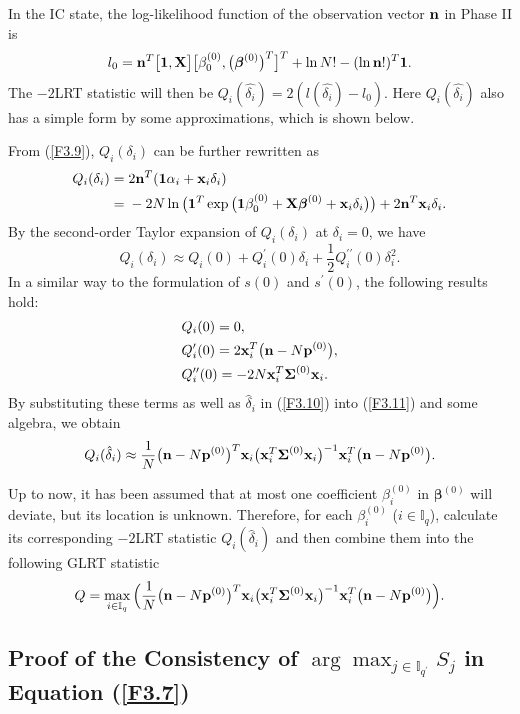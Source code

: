 In the IC state, the log-likelihood function of the observation vector ${\bf n}$ in
Phase II is
\[
l_0={\bf n}^T\big[\boldsymbol{1},{\bf
X}\big]\big[\beta^{(0)}_0,\big(\boldsymbol{\beta}^{(0)}\big)^T\big]^T+\ln N!-(\ln{\bf
n}!)^T\boldsymbol{1}.
\]
The $-2$LRT statistic will then be $Q_i(\hat{\delta_i})=2(l(\hat{\delta_i})-l_0)$.
Here $Q_i(\hat{\delta_i})$ also has a simple form by some approximations, which is
shown below.

From (\ref{F3.9}), $Q_i(\delta_i)$ can be further rewritten as
\begin{align*}
Q_i(\delta_i)=&\;2{\bf n}^T(\boldsymbol{1}\alpha_i+{\bf
x}_i\delta_i)\\
=&\;-2N\ln\big(\boldsymbol{1}^T\exp\big(\boldsymbol{1}\beta^{(0)}_0 +{\bf X}\boldsymbol\beta^{(0)}+{\bf
x}_i\delta_i\big)\big) + 2{\bf n}^T{\bf x}_i\delta_i.
\end{align*}
By the second-order Taylor expansion of $Q_i(\delta_i)$ at $\delta_i=0$, we have
\begin{equation}
Q_i(\delta_i)\approx
Q_i(0)+Q_i^{\prime}(0)\delta_i+\frac{1}{2}Q_i^{\prime\prime}(0)\delta_i^2.\label{F3.11}
\end{equation}
In a similar way to the formulation of ${s(0)}$ and ${s^{\prime}(0)}$, the following
results hold:
\begin{align*}
&Q_i(0)=0,\\
&Q_i^{\prime}(0)=2{\bf x}_i^T\big({\bf n}-N{\bf p}^{(0)}\big),\\
&Q_i^{\prime\prime}(0)=-2N{\bf x}_i^T\boldsymbol{\Sigma}^{(0)}{\bf x}_i.
\end{align*}
By substituting these terms as well as $\hat{\delta}_i$ in (\ref{F3.10}) into
(\ref{F3.11}) and some algebra, we obtain
\[
Q_i(\hat{\delta}_i)\approx\frac{1}{N}\big({\bf n}-N{\bf p}^{(0)}\big)^T{\bf
x}_i\big({\bf x}_i^T\boldsymbol{\Sigma}^{(0)}{\bf x}_i\big)^{-1}{\bf x}_i^T\big({\bf
n}-N{\bf p}^{(0)}\big).
\]

Up to now, it has been assumed that at most one coefficient $\beta_i^{(0)}$ in
$\bm{\beta}^{(0)}$ will deviate, but its location is unknown. Therefore, for each
$\beta_i^{(0)}$ ($i\in\mathbb{I}_q$), calculate its corresponding $-2$LRT statistic
$Q_i(\hat{\delta}_i)$ and then combine them into the following GLRT statistic
\begin{align*}
Q=\max_{i\in\mathbb{I}_q}\Big(\frac{1}{N}\big({\bf n}-N{\bf p}^{(0)}\big)^T{\bf
x}_i\big({\bf x}_i^T\boldsymbol{\Sigma}^{(0)}{\bf x}_i\big)^{-1}{\bf x}_i^T\big({\bf
n}-N{\bf p}^{(0)}\big)\Big).
\end{align*}

\subsection{Proof of the Consistency of $\arg\max_{j\in\mathbb{I}_{q^{\prime}}}S_j$ in Equation (\ref{F3.7})}

